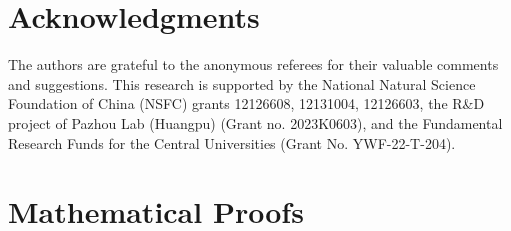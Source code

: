 \documentclass[letterpaper]{article} %
\begin{document}
	\section{Acknowledgments}
	The authors are grateful to the anonymous referees for their valuable comments and suggestions.  This research is supported by the National Natural Science Foundation of China (NSFC) grants 12126608,  12131004, 12126603,  the R\&D project of Pazhou Lab (Huangpu) (Grant no. 2023K0603), and the Fundamental Research Funds for the Central Universities (Grant No. YWF-22-T-204).
	
	
	
	\onecolumn
	\appendix
	\section{Mathematical Proofs} \label{proof_details}
	
\end{document}
